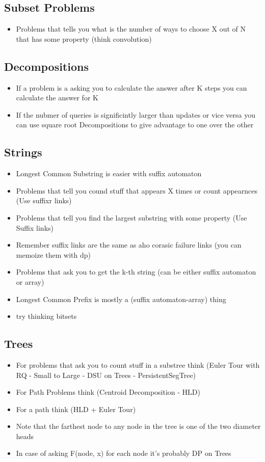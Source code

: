 \subsection{Subset Problems}
\begin{itemize}
\item Problems that tells you what is the number of ways to choose X out of N that has some property (think convolution)
\end{itemize}
\hrulefill
\subsection{Decompositions}
\begin{itemize}
\item If a problem is a asking you to calculate the answer after K steps you can calculate the answer for K%
\item If the nubmer of queries is significintly larger than updates or vice versa you can use square root Decompositions to give advantage to one over the other
\end{itemize}
\hrulefill
\subsection{Strings}
\begin{itemize}
\item Longest Common Substring is easier with suffix automaton 
\item Problems that tell you cound stuff that appears X times or count appearnces (Use suffixr links)
\item Problems that tell you find the largest substring with some property (Use Suffix links)
\item Remember suffix links are the same as aho corasic failure links (you can memoize them with dp)
\item Problems that ask you to get the k-th string (can be either suffix automaton or array)
\item Longest Common Prefix is mostly a (suffix automaton-array) thing
\item try thinking bitsets
\end{itemize}
\hrulefill 
\subsection{Trees}
\begin{itemize}
\item For problems that ask you to count stuff in a substree think (Euler Tour with RQ - Small to Large - DSU on Trees - PersistentSegTree)
\item For Path Problems think (Centroid Decomposition - HLD)
\item For a path think (HLD + Euler Tour)
\item Note that the farthest node to any node in the tree is one of the two diameter heads
\item In case of asking F(node, x) for each node it's probably DP on Trees
\end{itemize}
\hrulefill 
